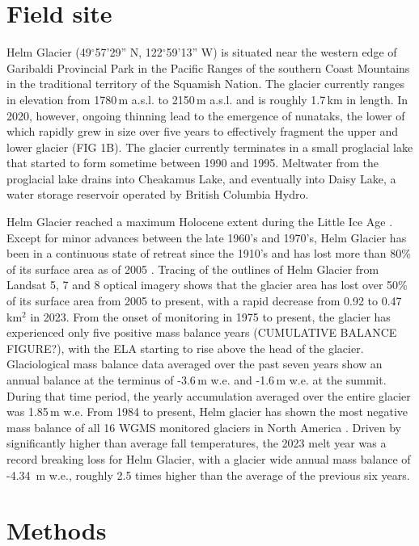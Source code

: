 \documentclass[annals,twocolumn,letterpaper]{igs}
\begin{document}
\section{Field site}

Helm Glacier (49$^{\circ}$57’29” N, 122$^{\circ}$59’13” W) is situated near the western edge of Garibaldi Provincial Park in the Pacific Ranges of the southern Coast Mountains in the traditional territory of the Squamish Nation. The glacier currently ranges in elevation from 1780\,m a.s.l. to 2150\,m a.s.l. and is roughly 1.7\,km in length. In 2020, however, ongoing thinning lead to the emergence of nunataks, the lower of which rapidly grew in size over five years to effectively fragment the upper and lower glacier (FIG 1B). The glacier currently terminates in a small proglacial lake that started to form sometime between 1990 and 1995. Meltwater from the proglacial lake drains into Cheakamus Lake, and eventually into Daisy Lake, a water storage reservoir operated by British Columbia Hydro. 

Helm Glacier reached a maximum Holocene extent during the Little Ice Age \citep{Ryder1986}.  Except for minor advances between the late 1960’s and 1970’s, Helm Glacier has been in a continuous state of retreat since the 1910’s and has lost more than 80\% of its surface area as of 2005 \citep{Koch2009}. Tracing of the outlines of Helm Glacier from Landsat 5, 7 and 8 optical imagery shows that the glacier area has lost over 50\% of its surface area from 2005 to present, with a rapid decrease from 0.92 to 0.47\,km$^2$ in 2023. From the onset of monitoring in 1975 to present, the glacier has experienced only five positive mass balance years (CUMULATIVE BALANCE FIGURE?), with the ELA starting to rise above the head of the glacier. Glaciological mass balance data averaged over the past seven years show an annual balance at the terminus of -3.6\,m w.e. and -1.6\,m w.e. at the summit. During that time period, the yearly accumulation averaged over the entire glacier was 1.85\,m w.e. From 1984 to present, Helm glacier has shown the most negative mass balance of all 16 WGMS monitored glaciers in North America \citep{WGMS2024}. Driven by significantly higher than average fall temperatures, the 2023 melt year was a record breaking loss for Helm Glacier, with a glacier wide annual mass balance of -4.34\, m w.e., roughly 2.5 times higher than the average of the previous six years. 

\section{Methods}
\end{document}
